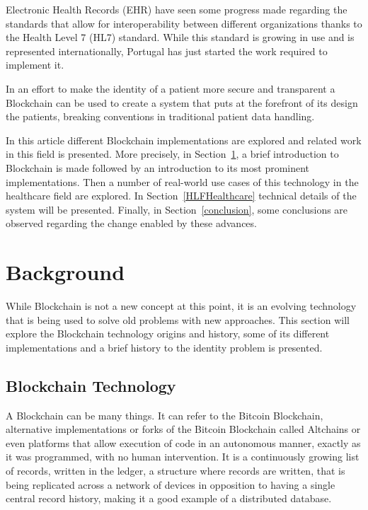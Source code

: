 \documentclass[]{llncs}
\begin{document}
Electronic Health Records (EHR) have seen some progress made regarding the
standards that allow for interoperability between different organizations
thanks to the Health Level 7 (HL7) standard.  While this standard is growing in
use and is represented internationally, Portugal has just started the work
required to implement it.  \cite{HealthLevel7}

In an effort to make the identity of a patient more secure and transparent a
Blockchain can be used to create a system that puts at the forefront of its
design the patients, breaking conventions in traditional patient data handling.

In this article different Blockchain implementations are explored and related
work in this field is presented.  More precisely, in Section~\ref{background},
a brief introduction to Blockchain is made followed by an introduction to its
most prominent implementations. Then a number of real-world use cases of this
technology in the healthcare field are explored. In Section~\ref{HLFHealthcare}
technical details of the system will be presented.  Finally, in
Section~\ref{conclusion},  some conclusions are observed regarding the change
enabled by these advances.



\section{Background} \label{background}

While Blockchain is not a new concept at this point, it is an evolving
technology that is being used to solve old problems with new approaches. This
section will explore the Blockchain technology origins and history, some of its
different implementations and a brief history to the identity problem is
presented.

\subsection{Blockchain Technology}

A Blockchain can be many things. It can refer to the Bitcoin Blockchain,
alternative implementations or forks of the Bitcoin Blockchain called Altchains
or even platforms that allow execution of code in an autonomous manner, exactly
as it was programmed, with no human intervention.  It is a continuously growing
list of records, written in the ledger, a structure where records are written,
that is being replicated across a network of devices in opposition to having a
single central record history, making it a good example of a distributed
database.  \cite{Wood2017}
  
\end{document}
